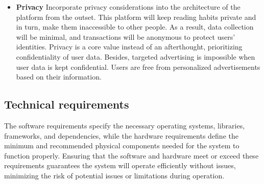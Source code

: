 \documentclass[12pt]{article}
\begin{document}
\begin{itemize}
	\item \textbf{Privacy}
	Incorporate privacy considerations into the architecture of the platform from the outset. This platform will keep reading habits private and in turn, make them inaccessible to other people. As a result, data collection will be minimal, and transactions will be anonymous to protect users’ identities. Privacy is a core value instead of an afterthought, prioritizing confidentiality of user data. Besides, targeted advertising is impossible when user data is kept confidential. Users are free from personalized advertisements based on their information.
	 
\end{itemize}

\subsection{Technical requirements}
The software requirements specify the necessary operating systems, libraries, frameworks, and dependencies, while the hardware requirements define the minimum and recommended physical components needed for the system to function properly. Ensuring that the software and hardware meet or exceed these requirements guarantees the system will operate efficiently without issues, minimizing the risk of potential issues or limitations during operation.\\\\
\end{document}

